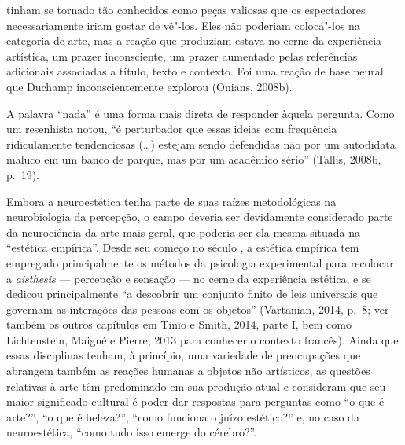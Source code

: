 tinham se tornado tão conhecidos como peças valiosas que os espectadores
necessariamente iriam gostar de vê"-los. Eles não poderiam colocá"-los na
categoria de arte, mas a reação que produziam estava no cerne da
experiência artística, um prazer inconsciente, um prazer aumentado pelas
referências adicionais associadas a título, texto e contexto. Foi uma
reação de base neural que Duchamp inconscientemente explorou (Onians,
2008b).

A palavra ``nada'' é uma forma mais direta de responder àquela pergunta.
Como um resenhista notou, ``é perturbador que essas ideias com
frequência ridiculamente tendenciosas (\ldots{}) estejam sendo defendidas não
por um autodidata maluco em um banco de parque, mas por um acadêmico
sério'' (Tallis, 2008b, p.~19).

Embora a neuroestética tenha parte de suas raízes metodológicas na
neurobiologia da percepção, o campo deveria ser devidamente considerado
parte da neurociência da arte mais geral, que poderia ser ela mesma
situada na ``estética empírica''. Desde seu começo no século , a
estética empírica tem empregado principalmente os métodos da psicologia
experimental para recolocar a \emph{aisthesis} --- percepção e sensação
--- no cerne da experiência estética, e se dedicou principalmente ``a
descobrir um conjunto finito de leis universais que governam as
interações das pessoas com os objetos'' (Vartanian, 2014, p.~8; ver
também os outros capítulos em Tinio e Smith, 2014, parte I, bem como
Lichtenstein, Maigné e Pierre, 2013 para conhecer o contexto francês).
Ainda que essas disciplinas tenham, à princípio, uma variedade de
preocupações que abrangem também as reações humanas a objetos não
artísticos, as questões relativas à arte têm predominado em sua produção
atual e consideram que seu maior significado cultural é poder dar
respostas para perguntas como ``o que é arte?'', ``o que é beleza?'',
``como funciona o juízo estético?'' e, no caso da neuroestética, ``como
tudo isso emerge do cérebro?''.

